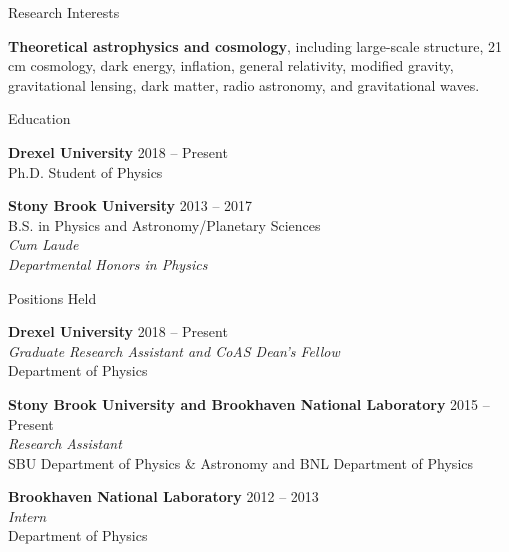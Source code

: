\documentclass{resume} %
\begin{document}


\begin{rSection}{Research Interests}

\textbf{Theoretical astrophysics and cosmology}, including large-scale structure, 21$\,$cm cosmology, dark energy, inflation, general relativity, modified gravity, gravitational lensing, dark matter, radio astronomy, and gravitational waves. 

\end{rSection}


\begin{rSection}{Education}

\textbf{Drexel University} \hfill {2018 -- Present} \\ 
Ph.D. Student of Physics

\textbf{Stony Brook University} \hfill {2013 -- 2017} \\
B.S. in Physics and Astronomy/Planetary Sciences\\
\textit{Cum Laude}\\
\textit{Departmental Honors in Physics}

\end{rSection}


\begin{rSection}{Positions Held}

\textbf{Drexel University} \hfill {2018 -- Present} \\
\textit{Graduate Research Assistant and CoAS Dean's Fellow}\\
Department of Physics

\textbf{Stony Brook University and Brookhaven National Laboratory} \hfill {2015 -- Present}\\
\textit{Research Assistant}\\
SBU Department of Physics \& Astronomy  and BNL Department of Physics

\textbf{Brookhaven National Laboratory} \hfill {2012 -- 2013}\\
\textit{Intern}\\
Department of Physics

\end{rSection}
\end{document}
